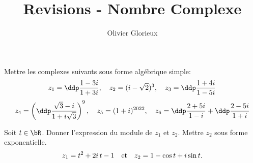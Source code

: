 \documentclass[a4paper, 11pt,reqno]{article}
\author{Olivier Glorieux}
\begin{document}
\title{Revisions - Nombre Complexe }


\vspace{1cm}
\begin{exercice}
Mettre les complexes suivants sous forme alg\'ebrique simple:
$$z_1=\ddp\frac{1-3i}{1+3i}, \quad z_2=(i-\sqrt{2})^3
, \quad z_3=\ddp\frac{1+4i}{1-5i}$$
  $$z_4=\left(\ddp\frac{\sqrt{3}-i}{1+i\sqrt{3}}  \right)^9, \quad 
 z_5=(1+i)^{2022}, \quad 
 z_6=\ddp\frac{2+5i}{1-i}+\ddp\frac{2-5i}{1+i}$$
\end{exercice}
\vspace{1cm}
\begin{exercice}  \;
Soit $t \in \bR$. Donner l'expression du module de $z_1$ et $z_2$. Mettre $z_2$ sous forme exponentielle.
$$z_1=t^2+2i \, t-1\quad\hbox{et}\quad z_2=1-\cos{t}+i\sin{t}.$$
\end{exercice}
\end{document}
